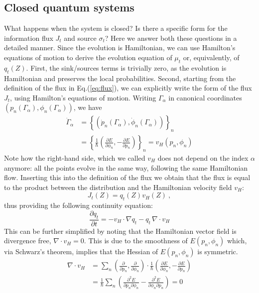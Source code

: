\documentclass[draft,nofootinbib,pre,twocolumn,showpacs,showkeys,preprintnumbers,floatfix]{revtex4-1}
\newcommand{\1}{\mathbbm{1}}
\newcommand{\p}{\partial}
\begin{document}
\subsection*{Closed quantum systems}

What happens when the system is closed? Is there a specific form for the information flux $J_t$ and source $\sigma_t$?
Here we answer both these questions in a detailed manner. Since the evolution is Hamiltonian, we can 
use Hamilton's equations of motion to derive the evolution equation of $\mu_t$ or, equivalently, of $q_t(Z)$.
First, the sink/sources terms is trivially zero, as the evolution is Hamiltonian and preserves the local probabilities.
Second, starting from the definition of the flux in Eq.(\ref{eq:flux}), we can explicitly write the form of the flux $J_t$, 
using Hamilton's equations of motion. Writing $\Gamma_\alpha$ in canonical coordinates $(p_n(\Gamma_\alpha),\phi_n(\Gamma_\alpha))$, 
we have 
\begin{align}
\dot{\Gamma}_\alpha & = \left\{\left( \dot{p}_n(\Gamma_\alpha), \dot{\phi}_n(\Gamma_\alpha)\right)\right\}_n \nonumber \\
& = \left\{\frac{1}{\hbar}\left( \frac{\partial E}{\partial \phi_n}, -\frac{\partial E}{\partial p_n}  \right)\right\}_n = v_H(p_n,\phi_n)
\end{align}
Note how the right-hand side, which we called $v_H$ does not depend on the index $\alpha$ anymore: all 
the points evolve in the same way, following the same Hamiltonian flow. Inserting this into the definition of the flux 
we obtain that the flux is equal to the product between the distribution and the Hamiltonian velocity field $v_H$:
\begin{equation}
J_t(Z) = q_t(Z) v_H(Z)~,
\end{equation}
thus providing the following continuity equation:
\begin{equation}
\frac{\partial q_t}{\partial t} = - v_H \cdot \nabla q_t - q_t \, \nabla \cdot v_H
\end{equation}
This can be further simplified by noting that the Hamiltonian vector field is divergence free, $\nabla \cdot v_H = 0$.
This is due to the smoothness of $E(p_n,\phi_n)$ which, via Schwarz's theorem, implies that the Hessian of $E(p_n,\phi_n)$ 
is symmetric. 
\begin{align}
\nabla \cdot v_H &= \sum_n \left( \frac{\partial}{\partial p_n} , \frac{\partial}{\partial \phi_n}\right) \cdot \frac{1}{\hbar}\left(\frac{\p E}{\p \phi_n}, -\frac{\p E}{\p p_n} \right) \nonumber \\
& = \frac{1}{\hbar} \sum_n \left( \frac{\p^2 E}{\p p_n \p \phi_n } - \frac{\p^2 E}{\p \phi_n \p p_n }\right) = 0 \nonumber
\end{align}
\end{document}
